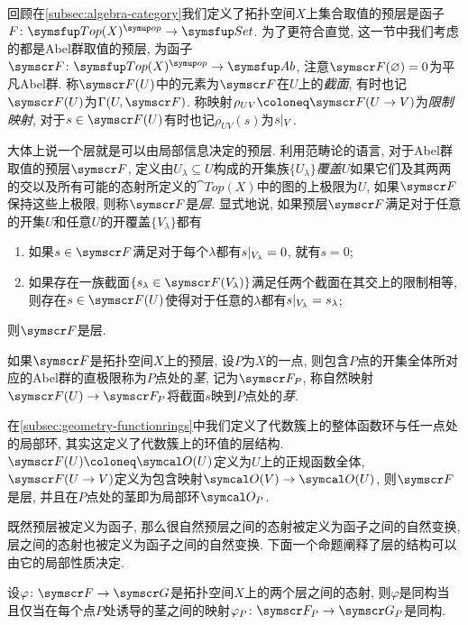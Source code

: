 回顾在\ref{subsec:algebra-category}我们定义了拓扑空间$X$上集合取值的预层是函子$F\colon \cat{Top}(X)^{\op}\to\cat{Set}$. 为了更符合直觉, 这一节中我们考虑的都是Abel群取值的预层, 为函子$\sheaf{F}\colon \cat{Top}(X)^{\op}\to\cat{Ab}$, 注意$\sheaf{F}(\varnothing)=0$为平凡Abel群. 称$\sheaf{F}(U)$中的元素为$\sheaf{F}$在$U$上的\emph{截面}, 有时也记$\sheaf{F}(U)$为$\Gamma (U, \sheaf{F})$. 称映射$\rho_{UV}\coloneq \sheaf{F}(U\to V)$为\emph{限制映射}, 对于$s\in \sheaf{F}(U)$有时也记$\rho_{UV}(s)$为$s\vert_{V}$.

大体上说一个层就是可以由局部信息决定的预层. 利用范畴论的语言, 对于Abel群取值的预层$\sheaf{F}$, 定义由$U_\lambda\subseteq U$构成的开集族$\{U_\lambda\}$\emph{覆盖}$U$如果它们及其两两的交以及所有可能的态射所定义的$\cat{Top}(X)$中的图的上极限为$U$, 如果$\sheaf{F}$保持这些上极限, 则称$\sheaf{F}$是\emph{层}. 显式地说, 如果预层$\sheaf{F}$满足对于任意的开集$U$和任意$U$的开覆盖$\{V_\lambda\}$都有
\begin{enumerate}
  \item 如果$s\in\sheaf{F}$满足对于每个$\lambda$都有$s\vert_{V_{\lambda}}=0$, 就有$s=0$;
  \item 如果存在一族截面$\{s_\lambda\in\sheaf{F(V_\lambda)}\}$满足任两个截面在其交上的限制相等, 则存在$s\in\sheaf{F(U)}$使得对于任意的$\lambda$都有$s\vert_{V_\lambda}=s_{\lambda}$;
\end{enumerate}
则$\sheaf{F}$是层.

如果$\sheaf{F}$是拓扑空间$X$上的预层, 设$P$为$X$的一点, 则包含$P$点的开集全体所对应的Abel群的直极限称为$P$点处的\emph{茎}, 记为$\sheaf{F}_P$, 称自然映射$\sheaf{F}(U)\to \sheaf{F}_P$将截面$s$映到$P$点处的\emph{芽}.

\begin{example}
  在\ref{subsec:geometry-functionrings}中我们定义了代数簇上的整体函数环与任一点处的局部环, 其实这定义了代数簇上的环值的层结构. $\sheaf{F}(U)\coloneq\OO (U)$定义为$U$上的正规函数全体, $\sheaf{F}(U\to V)$定义为包含映射$\OO (V)\to \OO(U)$, 则$\sheaf{F}$是层, 并且在$P$点处的茎即为局部环$\OO_P$.
\end{example}

既然预层被定义为函子, 那么很自然预层之间的态射被定义为函子之间的自然变换, 层之间的态射也被定义为函子之间的自然变换. 下面一个命题阐释了层的结构可以由它的局部性质决定.

\begin{proposition}
  设$\varphi\colon \sheaf{F}\to\sheaf{G}$是拓扑空间$X$上的两个层之间的态射, 则$\varphi$是同构当且仅当在每个点$P$处诱导的茎之间的映射$\varphi_P\colon \sheaf{F}_P\to\sheaf{G}_P$是同构.
\end{proposition}

